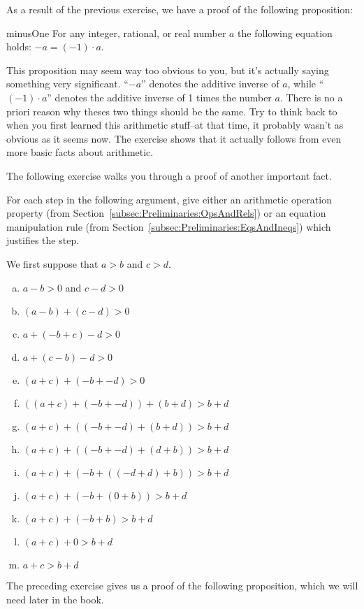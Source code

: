 As a result of the previous exercise, we have a proof of the following proposition:

\begin{prop}{minusOne}
For any integer, rational, or real number $a$ the following equation holds: $ -a =  (-1) \cdot a $. 
\end{prop}
This proposition may seem way too obvious to you, but it's actually saying something very significant. ``$-a$'' denotes the additive inverse of $a$, while ``$(-1) \cdot a$'' denotes the additive inverse of 1 times the number $a$. There is no a priori reason why theses two things should be the same. Try to think back to when you first learned this arithmetic stuff--at that time, it probably wasn't as obvious as it seems now. The exercise shows that it actually follows from even more basic facts about arithmetic.


The following exercise walks you through a proof of another important fact.

\begin{exercise}{}
For each step in the following argument, give either an arithmetic operation property (from Section~\ref{subsec:Preliminaries:OpsAndRels}) or an equation manipulation rule (from Section~\ref{subsec:Preliminaries:EqsAndIneqs}) which justifies the step.

\noindent
We first suppose that $a>b$ and $c>d$. 
\begin{enumerate}[(a)]
\item
$a-b>0$ and $c-d>0$
\item
$(a-b) + (c-d) > 0$
\item
$a + (-b+c) - d > 0$
\item
$a + (c-b) - d > 0$
\item
$(a+c) + (-b + -d) > 0$
\item
$((a+c) + (-b + -d)) + (b+d) > b+d$
\item
$(a+c) + ((-b + -d) + (b+d)) > b+d$
\item
$(a+c) + ((-b + -d) + (d+b)) > b+d$
\item
$(a+c) + (-b + ((-d + d) +b)) > b+d$
\item
$(a+c) + (-b + (0 +b)) > b+d$
\item
$(a+c) + (-b + b) > b+d$
\item
$(a+c)  + 0 > b+d$
\item
$a+c > b+d$
\end{enumerate}
\end{exercise}

The preceding exercise gives us a proof of the following proposition, which we will need later in the book.

